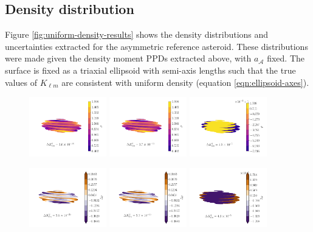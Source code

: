 \documentclass[fleqn,usenatbib]{mnras}
\begin{document}
\subsection{Density distribution}
\label{sec:asym-density}
Figure \ref{fig:uniform-density-results} shows the density distributions and uncertainties extracted for the asymmetric reference asteroid. These distributions were made given the density moment PPDs extracted above, with $a_\mathcal{A}$ fixed. The surface is fixed as a triaxial ellipsoid with semi-axis lengths such that the true values of $K_{\ell m}$ are consistent with uniform density (equation \ref{eqn:ellipsoid-axes}).

\begin{figure}
  \centering
  \includegraphics[width=0.3\textwidth]{figs/asym-ell-likelihood.pdf}\hfill
  \includegraphics[width=0.3\textwidth]{figs/asym-ell-harmonic.pdf}\hfill
  \includegraphics[width=0.3\textwidth]{figs/asym-ell-lumpy.pdf}

  \includegraphics[width=0.3\textwidth]{figs/asym-ell-diff-likelihood.pdf}\hfill
  \includegraphics[width=0.3\textwidth]{figs/asym-ell-diff-harmonic.pdf}\hfill
  \includegraphics[width=0.3\textwidth]{figs/asym-ell-diff-lumpy.pdf}


\end{figure}
\end{document}
